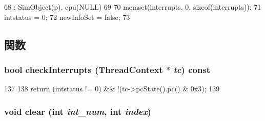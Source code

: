\begin{DoxyCode}
68                            : SimObject(p), cpu(NULL)
69     {
70         memset(interrupts, 0, sizeof(interrupts));
71         intstatus = 0;
72         newInfoSet = false;
73     }
\end{DoxyCode}


\subsection{関数}
\hypertarget{classAlphaISA_1_1Interrupts_af3c66fb49fec598cf78aaec29d764952}{
\subsubsection[{checkInterrupts}]{\setlength{\rightskip}{0pt plus 5cm}bool checkInterrupts ({\bf ThreadContext} $\ast$ {\em tc}) const}}
\label{classAlphaISA_1_1Interrupts_af3c66fb49fec598cf78aaec29d764952}



\begin{DoxyCode}
137     {
138         return (intstatus != 0) && !(tc->pcState().pc() & 0x3);
139     }
\end{DoxyCode}
\hypertarget{classAlphaISA_1_1Interrupts_af60c3484087379d0330467d77f6cbaae}{
\subsubsection[{clear}]{\setlength{\rightskip}{0pt plus 5cm}void clear (int {\em int\_\-num}, \/  int {\em index})}}
\label{classAlphaISA_1_1Interrupts_af60c3484087379d0330467d77f6cbaae}



